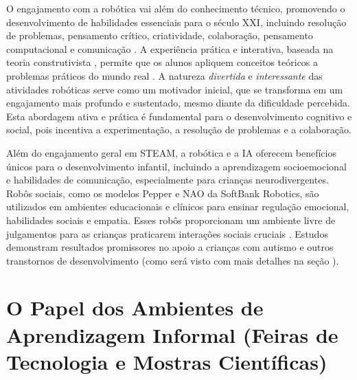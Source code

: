 \documentclass[%
  12pt,%
  a4paper,%
  oneside,%
  openright,%
  sumario = abnt-6027-2012,%
  chapter = TITLE,%
  pretextualoneside,%
  fontetimes,%
  semrecuonosumario,%
  usemakeindex,%
  pardeassinaturas,%
  english,%
  french,%
  spanish,%
  brazil,%
]{utfpr}%
\begin{document}
O engajamento com a robótica vai além do conhecimento técnico, promovendo o desenvolvimento de habilidades essenciais para o século XXI, incluindo resolução de problemas, pensamento crítico, criatividade, colaboração, pensamento computacional e comunicação \cite{meegleYouthRobotics2025}. A experiência prática e interativa, baseada na teoria construtivista \cite{ross2024BeyondExhibits}, permite que os alunos apliquem conceitos teóricos a problemas práticos do mundo real \cite{meegleYouthRobotics2025}. A natureza \emph{divertida} e \emph{interessante} das atividades robóticas \cite{cheung2024SummerLibraries} serve como um motivador inicial, que se transforma em um engajamento mais profundo e sustentado, mesmo diante da dificuldade percebida. Esta abordagem ativa e prática é fundamental para o desenvolvimento cognitivo e social, pois incentiva a experimentação, a resolução de problemas e a colaboração.

Além do engajamento geral em STEAM, a robótica e a IA oferecem benefícios únicos para o desenvolvimento infantil, incluindo a aprendizagem socioemocional e habilidades de comunicação, especialmente para crianças neurodivergentes. Robôs sociais, como os modelos Pepper e NAO da SoftBank Robotics, são utilizados em ambientes educacionais e clínicos para ensinar regulação emocional, habilidades sociais e empatia. Esses robôs proporcionam um ambiente livre de julgamentos para as crianças praticarem interações sociais cruciais \cite{behavioralHealthRoboticsAI2025}. Estudos demonstram resultados promissores no apoio a crianças com autismo e outros transtornos de desenvolvimento (como será visto com mais detalhes na seção ). %

\section{O Papel dos Ambientes de Aprendizagem Informal (Feiras de Tecnologia e Mostras Científicas)}
\end{document}
